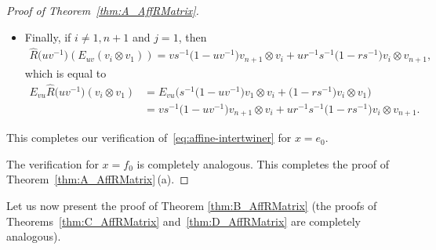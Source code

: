 \documentclass[10pt,a4paper]{amsart}
\numberwithin{equation}{section}
\begin{document}
\begin{proof}[Proof of Theorem~\ref{thm:A_AffRMatrix}]
\begin{itemize}
\item
Finally, if $i \neq 1,n + 1$ and $j = 1$, then
\begin{gather*}
 \hat{R}\bigl(uv^{-1}\bigr)(E_{uv}(v_{i} \otimes v_{1})) =
 vs^{-1}\bigl(1 - uv^{-1}\bigr)v_{n+1} \otimes v_{i} + ur^{-1}s^{-1}\bigl(1 - rs^{-1}\bigr)v_{i} \otimes v_{n+1},
\end{gather*}
which is equal to
\begin{displaymath}
\begin{split}
 E_{vu}\hat{R}\bigl(uv^{-1}\bigr)(v_{i} \otimes v_{1})
 & = E_{vu}\bigl(s^{-1}\bigl(1 - uv^{-1}\bigr)v_{1} \otimes v_{i} + \bigl(1 - rs^{-1}\bigr)v_{i} \otimes v_{1}\bigr) \\
 & = vs^{-1}\bigl(1 - uv^{-1}\bigr)v_{n+1} \otimes v_{i} + ur^{-1}s^{-1}\bigl(1 - rs^{-1}\bigr)v_{i} \otimes v_{n+1}.
\end{split}
\end{displaymath}

\end{itemize}
This completes our verification of~\eqref{eq:affine-intertwiner} for $x = e_{0}$.

The verification for $x = f_{0}$ is completely analogous. This completes the proof of Theorem~\ref{thm:A_AffRMatrix}\,(a).
\end{proof}

Let us now present the proof of Theorem \ref{thm:B_AffRMatrix} (the proofs of Theorems~\ref{thm:C_AffRMatrix} and~\ref{thm:D_AffRMatrix} are completely analogous).
\end{document}
